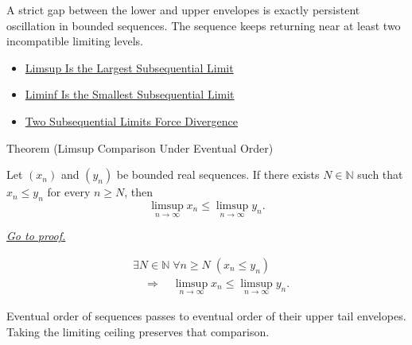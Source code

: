\begin{remark*}[Interpretation]
A strict gap between the lower and upper envelopes is exactly persistent
oscillation in bounded sequences. The sequence keeps returning near at least
two incompatible limiting levels.
\end{remark*}

\begin{remark*}[Dependencies]\hfill
\begin{itemize}
  \item \hyperref[thm:limsup-largest-subsequential-limit]{Limsup Is the Largest Subsequential Limit}
  \item \hyperref[thm:liminf-smallest-subsequential-limit]{Liminf Is the Smallest Subsequential Limit}
  \item \hyperref[thm:two-subsequential-limits-force-divergence]{Two Subsequential Limits Force Divergence}
\end{itemize}
\end{remark*}


\begin{theorembox}{Theorem (Limsup Comparison Under Eventual Order)}
\begin{theorem}
\label{thm:limsup-comparison-under-eventual-order}
Let $(x_n)$ and $(y_n)$ be bounded real sequences. If there exists
$N\in\mathbb{N}$ such that $x_n\le y_n$ for every $n\ge N$, then
\[
  \limsup_{n\to\infty}x_n
  \le
  \limsup_{n\to\infty}y_n.
\]

\smallskip
\noindent
\hyperref[prf:limsup-comparison-under-eventual-order]{\textit{Go to proof.}}
\end{theorem}
\end{theorembox}

\begin{remark*}
\[
\begin{aligned}
&\exists N\in\mathbb{N}\;\forall n\ge N\;(x_n\le y_n)\\
&\quad\Longrightarrow\quad
\limsup_{n\to\infty}x_n
\le
\limsup_{n\to\infty}y_n.
\end{aligned}
\]
\end{remark*}

\begin{remark*}[Interpretation]
Eventual order of sequences passes to eventual order of their upper tail
envelopes. Taking the limiting ceiling preserves that comparison.
\end{remark*}

